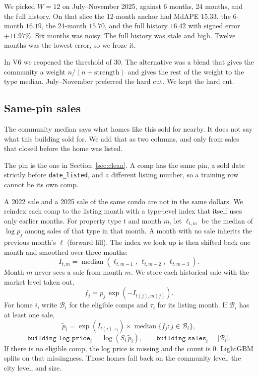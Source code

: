 \documentclass[11pt]{article}
\begin{document}
We picked \(W = 12\) on July--November 2025, against 6 months, 24 months, and the full history. On that slice the 12-month anchor had MdAPE \(15.33\), the 6-month \(16.19\), the 24-month \(15.70\), and the full history \(16.42\) with signed error \(+11.97\%\). Six months was noisy. The full history was stale and high. Twelve months was the lowest error, so we froze it.

In V6 we reopened the threshold of 30. The alternative was a blend that gives the community a weight \(n/(n + \text{strength})\) and gives the rest of the weight to the type median. July--November preferred the hard cut. We kept the hard cut.

\subsection{Same-pin sales}
\label{sec:building}

The community median says what homes like this sold for nearby. It does not say what this building sold for. We add that as two columns, and only from sales that closed before the home was listed.

The pin is the one in Section~\ref{sec:clean}. A comp has the same pin, a sold date strictly before \texttt{date\_listed}, and a different listing number, so a training row cannot be its own comp.

A 2022 sale and a 2025 sale of the same condo are not in the same dollars. We reindex each comp to the listing month with a type-level index that itself uses only earlier months. For property type \(t\) and month \(m\), let \(\ell_{t,m}\) be the median of \(\log p_j\) among sales of that type in that month. A month with no sale inherits the previous month's \(\ell\) (forward fill). The index we look up is then shifted back one month and smoothed over three months:
\[
I_{t,m} = \operatorname{median}(\ell_{t,m-1},\, \ell_{t,m-2},\, \ell_{t,m-3}).
\]
Month \(m\) never sees a sale from month \(m\). We store each historical sale with the market level taken out,
\[
f_j = p_j \,\exp(-I_{t(j), m(j)}).
\]
For home \(i\), write \(\mathcal{B}_i\) for the eligible comps and \(\tau_i\) for its listing month. If \(\mathcal{B}_i\) has at least one sale,
\[
\widetilde p_i = \exp(I_{t(i), \tau_i}) \times \operatorname{median}\{f_j : j \in \mathcal{B}_i\},
\]
\[
\texttt{building\_log\_price}_i = \log(S_i \,\widetilde p_i), \qquad
\texttt{building\_sales}_i = |\mathcal{B}_i|.
\]
If there is no eligible comp, the log price is missing and the count is 0. LightGBM splits on that missingness. Those homes fall back on the community level, the city level, and size.
\end{document}
